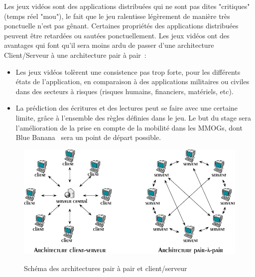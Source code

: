 	\par Les jeux vidéos sont des applications distribuées qui ne sont pas dites "critiques" (temps réel "mou"), le fait que le jeu ralentisse légèrement de manière très ponctuelle n'est pas gênant. Certaines propriétés des applications distribuées peuvent être retardées ou sautées ponctuellement. Les jeux vidéos ont des avantages qui font qu'il sera moins ardu de passer d'une architecture Client/Serveur à une architecture pair à pair~\cite{1267692}:
	\begin{itemize}
		\renewcommand{\labelitemi}{$\bullet$}
		\item Les jeux vidéos tolèrent une consistence pas trop forte, pour les différents états de l'application, en comparaison à des applications militaires ou civiles dans des secteurs à risques (risques humains, financiers, matériels, etc).
		\item La prédiction des écritures et des lectures peut se faire avec une certaine limite, grâce à l'ensemble des règles définies dans le jeu. Le but du stage sera l'amélioration de la prise en compte de la mobilité dans les MMOGs, dont Blue Banana~\cite{191} sera un point de départ possible.
	\end{itemize}
	\vspace{1cm}
	\begin{figure}[!h]
	\centering
	\includegraphics[scale=0.5]{./Ressources/Images/p2p-85145.png}\\
	\caption{Schéma des architectures pair à pair et client/serveur}
	\label{P2P/ClServ}
	\end{figure} 
\newpage
